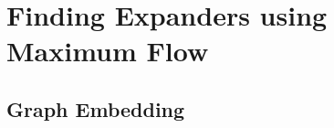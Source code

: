
\chapter{Finding Expanders using Maximum Flow}\label{cha:expanders_using_max_flow}

\section{Graph Embedding}